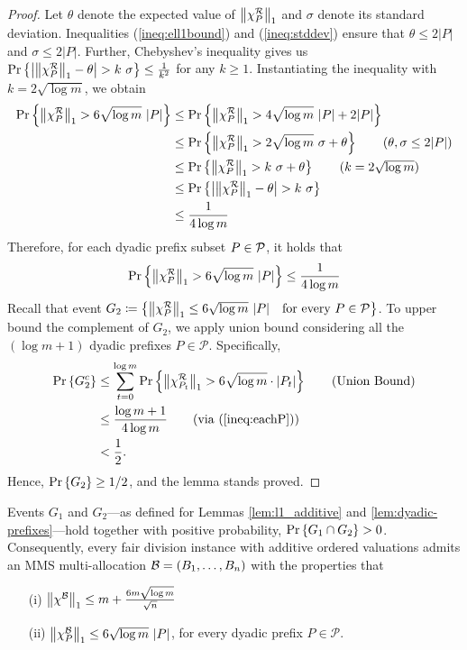 \begin{proof}
    Let $\theta$ denote the expected value of $\left\|\chi^{\mathcal{R}}_P\right\|_1$ and $\sigma$ denote its standard deviation. Inequalities (\ref{ineq:ell1bound}) and (\ref{ineq:stddev}) ensure that $\theta \leq 2|P|$ and $\sigma \leq 2 |P|$. Further, Chebyshev's inequality gives us $\Pr \left\{ \left| \left\|\chi^{\mathcal{R}}_P\right\|_1 - \theta \right| > k \ \sigma  \right\} \leq \frac{1}{k^2}$ for any $k \geq 1$. Instantiating the inequality with $k = 2\sqrt{\log m}$, we obtain  
    \begin{align}
        \prob{ \ellone{\chi^\calR_P} > 6 \sqrt{\log m} \ |P| } & \leq \prob{ \ellone{\chi^\calR_P} > 4  \sqrt{\log m} \ |P| + 2|P| } \nonumber \\  
        & \leq \prob{\ellone{\chi^\calR_P} > 2  \sqrt{\log m} \ \sigma + \theta }  \tag{$\theta, \sigma \leq 2|P|$} \\ 
        & \leq \prob{\ellone{\chi^\calR_P} > k \ \sigma + \theta }  \tag{$k = 2\sqrt{\log m}$} \\ 
        & \leq \prob{ \left| \ellone{\chi^\calR_P} - \theta \right| > k \ \sigma  } \nonumber \\
        & \leq \frac{1}{4 \log m} 
    \end{align}
 Therefore, for each dyadic prefix subset $P \in \mathcal{P}$, it holds that 
 \begin{align}
     \Pr \left\{\left\|\chi^{\mathcal{R}}_P\right\|_1 > 6 \sqrt{\log m} \ |P| \right\} \leq \frac{1}{4\log m} \label{ineq:eachP}
 \end{align} 
 Recall that event $G_2 \coloneqq \left\{ \ellone{\chi^\calR_P}\leq 6 \sqrt{\log m}\ |P| \ \ \text{ for every } P\in\mathcal{P} \right\}$. To upper bound the complement of $G_2$, we apply union bound considering all the $(\log m + 1)$ dyadic prefixes $P\in\mathcal{P}$. Specifically,   
  \begin{align*} \prob{G^c_2} & \leq \sum_{t = 0}^{\log m} \prob{\ellone{\chi^\calR_{P_t}} > 6 \sqrt{\log m}\cdot |P_t|} 
  \tag{Union Bound} \\ 
  & \leq \frac{\log m + 1}{4\log m} \tag{via (\ref{ineq:eachP})} \\
  & < \frac{1}{2}.
  \end{align*}
  Hence, $\Pr \left\{G_2\right\} \geq 1/2$, and the lemma stands proved. 
\end{proof}

\begin{corollary} \label{cor:existence-of-b}
  Events $G_1$ and $G_2$---as defined for Lemmas \ref{lem:l1_additive} and \ref{lem:dyadic-prefixes}---hold together with positive probability, $\Pr \left\{G_1\cap G_2\right\}>0$. Consequently, every fair division instance with additive ordered valuations admits an MMS multi-allocation $\mathcal{B}=(B_1,\dots,B_n)$ with the properties that 
  \begin{itemize}
        \item[(i)] $\left\|\chi^{\mathcal{B}}\right\|_1 \leq m + \frac{6m  \sqrt{\log m} }{\sqrt{n}}$
        \item[(ii)] $\ellone{\chi^\calB_P}\leq 6 \sqrt{\log m}\ |P|$, for every dyadic prefix $P\in\mathcal{P}$.
    \end{itemize}
\end{corollary}

